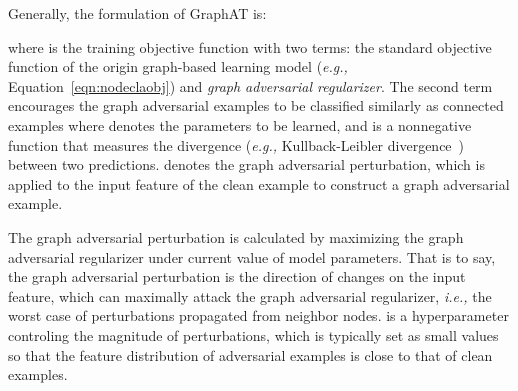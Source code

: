 \documentclass[10pt,journal,compsoc]{IEEEtran}
\newcommand{\ie}{\emph{i.e., }}
\newcommand{\eg}{\emph{e.g., }}
\begin{document}
Generally, the formulation of GraphAT is:

where  is the training objective function with two terms: the standard objective function of the origin graph-based learning model (\eg Equation~\ref{eqn:nodeclaobj}) and \textit{graph adversarial regularizer}. The second term encourages the graph adversarial examples to be classified similarly as connected examples where  denotes the parameters to be learned, and  is a nonnegative function that measures the divergence (\eg Kullback-Leibler divergence~\cite{Joyce2013Kullback}) between two predictions.  denotes the graph adversarial perturbation, which is applied to the input feature of the clean example  to construct a graph adversarial example.

The graph adversarial perturbation is calculated by maximizing the graph adversarial regularizer under current value of model parameters. That is to say, the graph adversarial perturbation is the direction of changes on the input feature, which can maximally attack the graph adversarial regularizer, \ie the worst case of perturbations propagated from neighbor nodes.  is a hyperparameter controling the magnitude of perturbations, which is typically set as small values so that the feature distribution of adversarial examples is close to that of clean examples.
\end{document}
